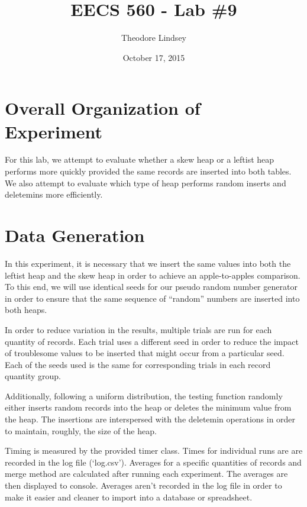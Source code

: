 \documentclass{article}
\title{EECS 560 - Lab \#9}
\author{Theodore Lindsey}
\date{October 17, 2015}
\begin{document}
\maketitle


\section{Overall Organization of Experiment}
For this lab, we attempt to evaluate whether a skew heap or a leftist heap performs more quickly 
provided the same records are inserted into both tables.  We also attempt to evaluate which type of 
heap performs random inserts and deletemins more efficiently.





\section{Data Generation}
In this experiment, it is necessary that we insert the same values into both the leftist heap and 
the skew heap in order to achieve an apple-to-apples comparison.  To this end, we will use identical 
seeds for our pseudo random number generator in order to ensure that the same sequence of ``random'' 
numbers are inserted into both heaps.

In order to reduce variation in the results, multiple trials are run for each quantity of records.  
Each trial uses a different seed in order to reduce the impact of troublesome values to be inserted 
that might occur from a particular seed.  Each of the seeds used is the same for corresponding 
trials in each record quantity group.

Additionally, following a uniform distribution, the testing function randomly either inserts random 
records into the heap or deletes the minimum value from the heap.  The insertions are interspersed 
with the deletemin operations in order to maintain, roughly, the size of the heap.

Timing is measured by the provided timer class.  Times for individual runs are are recorded in the 
log file (`log.csv').  Averages for a specific quantities of records and merge method are calculated 
after running each experiment.  The averages are then displayed to console. Averages aren't recorded 
in the log file in order to make it easier and cleaner to import into a database or spreadsheet.
\end{document}
